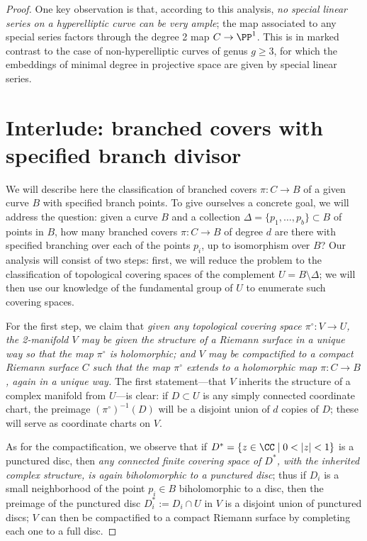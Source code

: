 \begin{proof}
One key observation is that, according to this analysis, \emph{no special linear series on a hyperelliptic curve can be very ample}; the map associated to any special series factors through the degree 2 map $C \to \PP^1$. This is in marked contrast to the case of non-hyperelliptic curves of genus $g \geq 3$, for which the embeddings of minimal degree in projective space are given by special linear series. 

   \section{Interlude: branched covers with specified branch divisor}\label{branched covers}
   
   We will describe here the classification of branched covers $\pi : C \to B$ of a given curve $B$ with specified branch points. To give ourselves a concrete goal, we will address the question: given a curve $B$ and a collection $\Delta = \{p_1,\dots,p_b\} \subset B$ of points in $B$, how many branched covers $\pi : C \to B$ of degree $d$ are there with specified branching over each of the points $p_i$, up to isomorphism over $B$? Our analysis will consist of two steps: first, we will reduce the problem to the classification of topological covering spaces of the complement $U = B \setminus \Delta$; we will then use our knowledge of the fundamental group of $U$ to enumerate such covering spaces.
   
   For the first step, we claim that \emph{given any topological covering space $\pi^\circ : V \to U$, the 2-manifold $V$ may be given the structure of a Riemann surface in a unique way so that the map $\pi^\circ$ is holomorphic; and $V$ may be compactified to a compact Riemann surface $C$ such that the map $\pi^\circ$ extends to a holomorphic map $\pi : C \to B$, again in a unique way.} The first statement---that $V$ inherits the structure of a complex manifold from $U$---is clear: if $D \subset U$ is any simply connected coordinate chart, the preimage $({\pi^\circ})^{-1}(D)$ will be a disjoint union of $d$ copies of $D$; these will serve as coordinate charts on $V$. 
   
   As for the compactification, we observe that if $D^* = \{ z \in \CC \mid 0 < |z| < 1 \}$ is a punctured disc, then \emph{any connected finite covering space of $D^*$, with the inherited complex structure, is again biholomorphic to a punctured disc}; thus if $D_i$ is a small neighborhood of the point $p_i \in B$ biholomorphic to a disc, then the preimage of the punctured disc $D_i^* := D_i \cap U$ in $V$ is a disjoint union of punctured discs; $V$ can then be compactified to a compact Riemann surface by completing each one to a full disc.
   

\end{proof}
